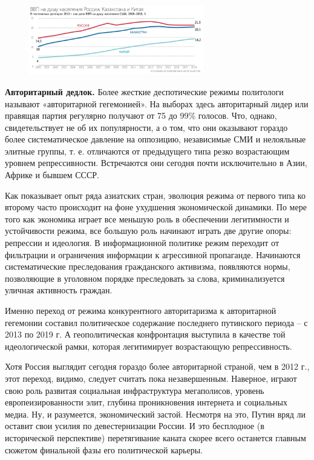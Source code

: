 \begin{figure}
    \begin{center}
        \includegraphics[width=0.68\textwidth]{img/1tbz.png}
    \end{center}
\end{figure}
\textbf{Авторитарный дедлок.} Более жесткие деспотические режимы политологи называют «авторитарной гегемонией». На выборах здесь авторитарный лидер или правящая партия регулярно получают от 75 до 99\% голосов. Что, однако, свидетельствует не об их популярности, а о том, что они оказывают гораздо более систематическое давление на оппозицию, независимые СМИ и нелояльные элитные группы, т. е. отличаются от предыдущего типа резко возрастающим уровнем репрессивности. Встречаются они сегодня почти исключительно в Азии, Африке и бывшем СССР.

Как показывает опыт ряда азиатских стран, эволюция режима от первого типа ко второму часто происходит на фоне ухудшения экономической динамики. По мере того как экономика играет все меньшую роль в обеспечении легитимности и устойчивости режима, все большую роль начинают играть две другие опоры: репрессии и идеология. В информационной политике режим переходит от фильтрации и ограничения информации к агрессивной пропаганде. Начинаются систематические преследования гражданского активизма, появляются нормы, позволяющие в уголовном порядке преследовать за слова, криминализуется уличная активность граждан.

Именно переход от режима конкурентного авторитаризма к авторитарной гегемонии составил политическое содержание последнего путинского периода – с 2013 по 2019 г. А геополитическая конфронтация выступила в качестве той идеологической рамки, которая легитимирует возрастающую репрессивность.

Хотя Россия выглядит сегодня гораздо более авторитарной страной, чем в 2012 г., этот переход, видимо, следует считать пока незавершенным. Наверное, играют свою роль развитая социальная инфраструктура мегаполисов, уровень европеизированности элит, глубина проникновения интернета и социальных медиа. Ну, и разумеется, экономический застой. Несмотря на это, Путин вряд ли оставит свои усилия по девестернизации России. И это бесплодное (в исторической перспективе) перетягивание каната скорее всего останется главным сюжетом финальной фазы его политической карьеры.




